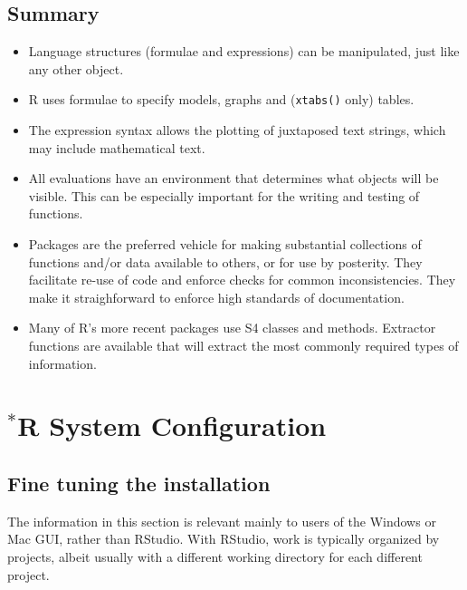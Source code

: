 \documentclass{tufte-book}\usepackage[]{graphicx}\usepackage[]{color}
\newcommand{\txtt}[1]{\texttt{#1}}
\begin{document}
\section{Summary}
\begin{itemize}
\item[] Language structures (formulae and expressions) can be manipulated,
just like any other object.

\item[] R uses formulae to specify models, graphs and (\txtt{xtabs()}
only) tables.

\item[] The expression syntax allows the plotting of juxtaposed text
strings, which may include mathematical text.

\item[] All evaluations have an environment that determines what
  objects will be visible. This can be especially important for the
writing and testing of functions.

\item[] Packages are the preferred vehicle for making substantial
  collections of functions and/or data available to others, or for use
  by posterity.  They facilitate re-use of code and enforce checks for
  common inconsistencies. They make it straighforward to enforce high
  standards of documentation.

\item[] Many of R's more recent packages use S4 classes and methods.
Extractor functions are available that will extract the most 
commonly required types of information.

\end{itemize}
\cleartooddpage

\appendix

\chapter{$^*$R System Configuration}\label{ch:sys}





\section{Fine tuning the installation}\label{sec:fine-tune}
The information in this section is relevant mainly to users of the Windows
or Mac GUI, rather than RStudio.  With RStudio, work is typically
organized by projects, albeit usually with a different working
directory for each different project.
\end{document}
